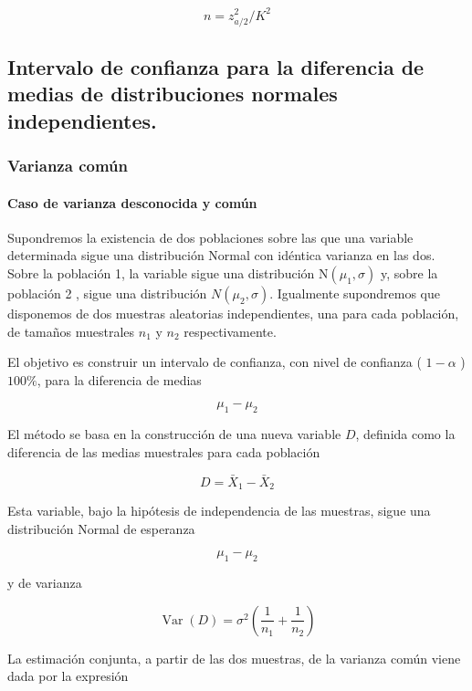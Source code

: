 \documentclass[
]{article}
\begin{document}
\[
n=z_{a / 2}^{2} / K^{2}
\]

\subsection{Intervalo de confianza para la diferencia de medias de distribuciones normales independientes.}\label{intervalo-de-confianza-para-la-diferencia-de-medias-de-distribuciones-normales-independientes.}

\subsubsection{Varianza común}\label{varianza-comuxfan}

\paragraph{Caso de varianza desconocida y común}\label{caso-de-varianza-desconocida-y-comuxfan}

Supondremos la existencia de dos poblaciones sobre las que una variable determinada sigue una distribución Normal con idéntica varianza en las dos. Sobre la población 1, la variable sigue una distribución \(\mathrm{N}\left(\mu_{1}, \sigma\right)\) y, sobre la población 2 , sigue una distribución \(N\left(\mu_{2}, \sigma\right)\). Igualmente supondremos que disponemos de dos muestras aleatorias independientes, una para cada población, de tamaños muestrales \(n_{1}\) y \(n_{2}\) respectivamente.

El objetivo es construir un intervalo de confianza, con nivel de confianza ( \(1-\alpha\) ) \(100 \%\), para la diferencia de medias

\[
\mu_{1}-\mu_{2}
\]

El método se basa en la construcción de una nueva variable \(D\), definida como la diferencia de las medias muestrales para cada población

\[
D=\bar{X}_{1}-\bar{X}_{2}
\]

Esta variable, bajo la hipótesis de independencia de las muestras, sigue una distribución Normal de esperanza

\[
\mu_{1}-\mu_{2}
\]

y de varianza

\[
\operatorname{Var}(D)=\sigma^{2}\left(\frac{1}{n_{1}}+\frac{1}{n_{2}}\right)
\]

La estimación conjunta, a partir de las dos muestras, de la varianza común viene dada por la expresión
\end{document}

